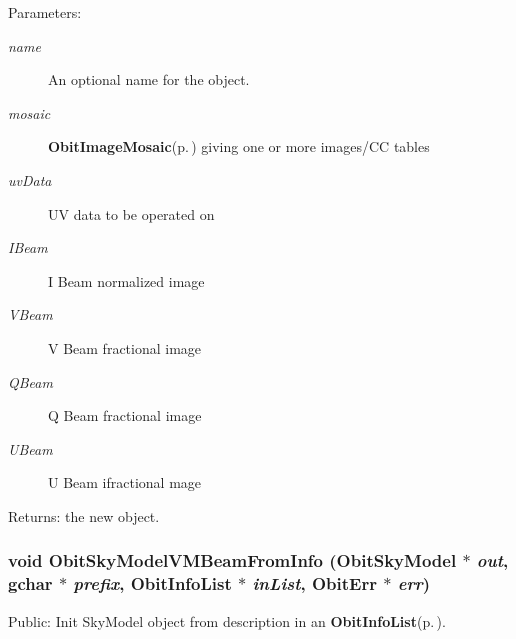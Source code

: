 \begin{Desc}
\item[Parameters:]
\begin{description}
\item[{\em name}]An optional name for the object. \item[{\em mosaic}]{\bf Obit\-Image\-Mosaic}{\rm (p.\,\pageref{structObitImageMosaic})} giving one or more images/CC tables \item[{\em uv\-Data}]UV data to be operated on \item[{\em IBeam}]I Beam normalized image \item[{\em VBeam}]V Beam fractional image \item[{\em QBeam}]Q Beam fractional image \item[{\em UBeam}]U Beam ifractional mage \end{description}
\end{Desc}
\begin{Desc}
\item[Returns:]the new object. \end{Desc}
\subsubsection{\setlength{\rightskip}{0pt plus 5cm}void Obit\-Sky\-Model\-VMBeam\-From\-Info ({\bf Obit\-Sky\-Model} $\ast$ {\em out}, gchar $\ast$ {\em prefix}, {\bf Obit\-Info\-List} $\ast$ {\em in\-List}, {\bf Obit\-Err} $\ast$ {\em err})}\label{ObitSkyModelVMBeam_8c_a12}


Public: Init Sky\-Model object from description in an {\bf Obit\-Info\-List}{\rm (p.\,\pageref{structObitInfoList})}. 

